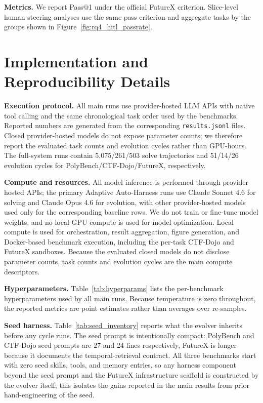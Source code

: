 \noindent\textbf{Metrics.}
We report Pass@1 under the official FutureX criterion. Slice-level human-steering analyses use the same pass criterion and aggregate tasks by the groups shown in Figure~\ref{fig:rq4_hitl_passrate}.

\section{Implementation and Reproducibility Details}
\label{app:experimental-details}

\noindent\textbf{Execution protocol.}
All main runs use provider-hosted LLM APIs with native tool calling and the same chronological task order used by the benchmarks. Reported numbers are generated from the corresponding \texttt{results.jsonl} files. Closed provider-hosted models do not expose parameter counts; we therefore report the evaluated task counts and evolution cycles rather than GPU-hours. The full-system runs contain 5{,}075/261/503 solve trajectories and 51/14/26 evolution cycles for PolyBench/CTF-Dojo/FutureX, respectively.

\noindent\textbf{Compute and resources.}
All model inference is performed through provider-hosted APIs; the primary Adaptive Auto-Harness runs use Claude Sonnet 4.6 for solving and Claude Opus 4.6 for evolution, with other provider-hosted models used only for the corresponding baseline rows. We do not train or fine-tune model weights, and no local GPU compute is used for model optimization. Local compute is used for orchestration, result aggregation, figure generation, and Docker-based benchmark execution, including the per-task CTF-Dojo and FutureX sandboxes. Because the evaluated closed models do not disclose parameter counts, task counts and evolution cycles are the main compute descriptors.

\noindent\textbf{Hyperparameters.}
Table~\ref{tab:hyperparams} lists the per-benchmark hyperparameters used by all main runs. Because temperature is zero throughout, the reported metrics are point estimates rather than averages over re-samples.



\noindent\textbf{Seed harness.}
Table~\ref{tab:seed_inventory} reports what the evolver inherits before any cycle runs. The seed prompt is intentionally compact: PolyBench and CTF-Dojo seed prompts are 27 and 24 lines respectively, FutureX is longer because it documents the temporal-retrieval contract. All three benchmarks start with zero seed skills, tools, and memory entries, so any harness component beyond the seed prompt and the FutureX infrastructure scaffold is constructed by the evolver itself; this isolates the gains reported in the main results from prior hand-engineering of the seed.

